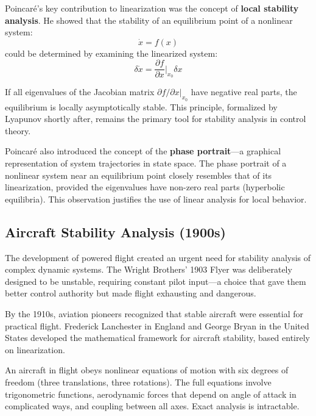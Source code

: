 Poincar\'{e}'s key contribution to linearization was the concept of \textbf{local stability analysis}. He showed that the stability of an equilibrium point of a nonlinear system:
\begin{equation}
\dot{x} = f(x)
\end{equation}
could be determined by examining the linearized system:
\begin{equation}
\delta\dot{x} = \frac{\partial f}{\partial x}\bigg|_{x_0} \delta x
\end{equation}

If all eigenvalues of the Jacobian matrix $\partial f/\partial x|_{x_0}$ have negative real parts, the equilibrium is locally asymptotically stable. This principle, formalized by Lyapunov shortly after, remains the primary tool for stability analysis in control theory.

Poincar\'{e} also introduced the concept of the \textbf{phase portrait}---a graphical representation of system trajectories in state space. The phase portrait of a nonlinear system near an equilibrium point closely resembles that of its linearization, provided the eigenvalues have non-zero real parts (hyperbolic equilibria). This observation justifies the use of linear analysis for local behavior.

\subsection{Aircraft Stability Analysis (1900s)}

The development of powered flight created an urgent need for stability analysis of complex dynamic systems. The Wright Brothers' 1903 Flyer was deliberately designed to be unstable, requiring constant pilot input---a choice that gave them better control authority but made flight exhausting and dangerous.

By the 1910s, aviation pioneers recognized that stable aircraft were essential for practical flight. Frederick Lanchester in England and George Bryan in the United States developed the mathematical framework for aircraft stability, based entirely on linearization.

An aircraft in flight obeys nonlinear equations of motion with six degrees of freedom (three translations, three rotations). The full equations involve trigonometric functions, aerodynamic forces that depend on angle of attack in complicated ways, and coupling between all axes. Exact analysis is intractable.


